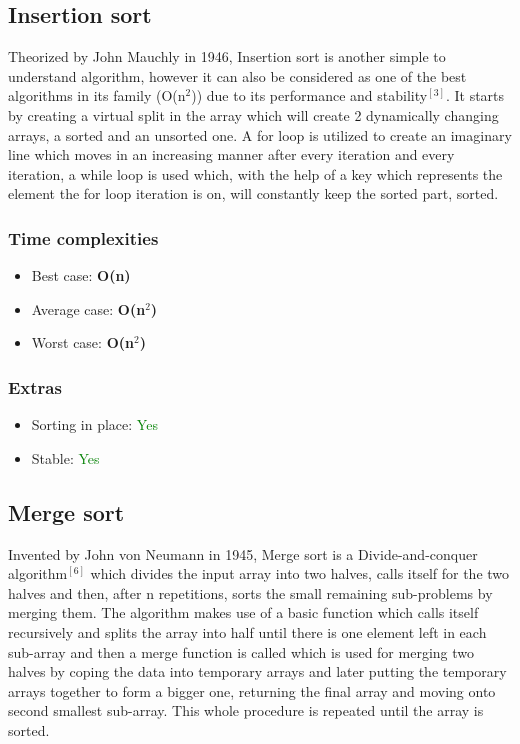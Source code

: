 \documentclass{article}
\begin{document}
\begin{multicols}{2}
\subsection{Insertion sort}
Theorized by John Mauchly in 1946, Insertion sort is another simple to understand algorithm, however it can also be considered as one of the best algorithms in its family (O(n$^2$)) due to its performance and stability$^{[3]}$. It starts by creating a virtual split in the array which will create 2 dynamically changing arrays, a sorted and an unsorted one. A for loop is utilized to create an imaginary line which moves in an increasing manner after every iteration and every iteration, a while loop is used which, with the help of a key which represents the element the for loop iteration is on, will constantly keep the sorted part, sorted.
\subsubsection{Time complexities}
\begin{itemize}
    \item Best case: \textbf{O(n)}
    \item Average case: \textbf{O(n$^2$)}
    \item Worst case: \textbf{O(n$^2$)}
\end{itemize}

\subsubsection{Extras}
\begin{itemize}
    \item Sorting in place: \textcolor{green}{Yes}
    \item Stable: \textcolor{green}{Yes}
\end{itemize}


\bigbreak \bigbreak \bigbreak \bigbreak \bigbreak \bigbreak \bigbreak \bigbreak


\subsection{Merge sort}
Invented by John von Neumann in 1945, Merge sort is a Divide-and-conquer algorithm$^{[6]}$ which divides the input array into two halves, calls itself for the two halves and then, after n repetitions, sorts the small remaining sub-problems by merging them. The algorithm makes use of a basic function which calls itself recursively and splits the array into half until there is one element left in each sub-array and then a merge function is called which is used for merging two halves by coping the data into temporary arrays and later putting the temporary arrays together to form a bigger one, returning the final array and moving onto second smallest sub-array. This whole procedure is repeated until the array is sorted. 


\end{multicols}
\end{document}
